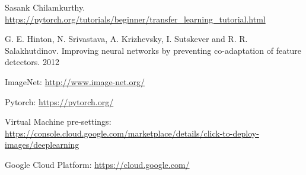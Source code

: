 \documentclass{article}
\begin{document}
\begin{thebibliography}{1}
	Sasank Chilamkurthy. \url{https://pytorch.org/tutorials/beginner/transfer_learning_tutorial.html}
	
	G. E. Hinton, N. Srivastava, A. Krizhevsky, I. Sutskever and R. R. Salakhutdinov.
	Improving neural networks by preventing co-adaptation of feature detectors. 2012
	
	ImageNet: \url{http://www.image-net.org/}
	
	Pytorch: \url{https://pytorch.org/}
	
	Virtual Machine pre-settings: \url{https://console.cloud.google.com/marketplace/details/click-to-deploy-images/deeplearning}
	
	Google Cloud Platform: \url{https://cloud.google.com/}

	
\end{thebibliography}
\end{document}
